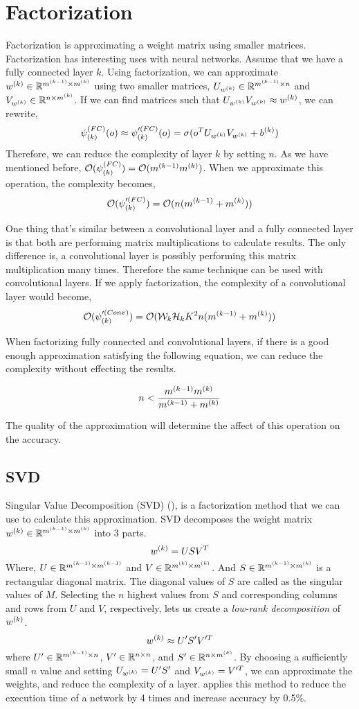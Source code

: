 \section{Factorization}
Factorization is approximating a weight matrix using smaller matrices. Factorization has interesting uses with neural networks. Assume that we have a fully connected layer $k$. Using factorization, we can approximate $w^{(k)} \in \mathbb{R}^{m^{(k-1)} \times m^{(k)}}$ using two smaller matrices, $U_{w^{(k)}} \in \mathbb{R}^{m^{(k-1)} \times n}$ and $V_{w^{(k)}} \in \mathbb{R}^{n \times m^{(k)}}$. If we can find matrices such that $U_{w^{(k)}}V_{w^{(k)}} \approx w^{(k)}$, we can rewrite, 
$$\psi^{(FC)}_{(k)}(o) \approx \psi'^{(FC)}_{(k)}(o) = \sigma(o^T U_{w^{(k)}}V_{w^{(k)}} +b^{(k)})$$
Therefore, we can reduce the complexity of layer $k$ by setting $n$. As we have mentioned before, $\mathcal{O}(\psi^{(FC)}_{(k)}) = \mathcal{O}(m^{(k-1)}m^{(k)})$. When we approximate this operation, the complexity becomes, 
$$\mathcal{O}(\psi'^{(FC)}_{(k)}) = \mathcal{O}(n(m^{(k-1)}+m^{(k)}))$$

One thing that's similar between a convolutional layer and a fully connected layer is that both are performing matrix multiplications to calculate results. The only difference is, a convolutional layer is possibly performing this matrix multiplication many times. Therefore the same technique can be used with convolutional layers. If we apply factorization, the complexity of a convolutional layer would become,
$$ \mathcal{O}(\psi'^{(Conv)}_{(k)}) =  \mathcal{O}(\mathcal{W}_{k}\mathcal{H}_{k}K^2n(m^{(k-1)}+m^{(k)})) $$

When factorizing fully connected and convolutional layers, if there is a good enough approximation satisfying the following equation, we can reduce the complexity without effecting the results.

$$n < \frac{m^{(k-1)}m^{(k)}}{m^{(k-1)}+m^{(k)}}$$ 

The quality of the approximation will determine the affect of this operation on the accuracy.

\subsection{SVD}
Singular Value Decomposition (SVD) (\cite{golub1970singular}), is a factorization method that we can use to calculate this approximation. SVD decomposes the weight matrix $w^{(k)} \in \mathbb{R}^{m^{(k-1)} \times m^{(k)}}$ into $3$ parts. 
$$ w^{(k)} = USV^T $$
Where, $U \in \mathbb{R}^{m^{(k-1)} \times m^{(k-1)}}$ and $V \in \mathbb{R}^{m^{(k)} \times m^{(k)}}$. And $S \in \mathbb{R}^{m^{(k-1)} \times m^{(k)}}$ is a rectangular diagonal matrix. The diagonal values of $S$ are called as the singular values of $M$. Selecting the $n$ highest values from $S$ and corresponding columns and rows from $U$ and $V$, respectively, lets us create a \textit{low-rank decomposition} of $w^{(k)}$. 
$$ w^{(k)} \approx U'S'V'^T $$
where $U' \in \mathbb{R}^{m^{(k-1)} \times n}$, $V' \in \mathbb{R}^{n \times n}$, and $S' \in \mathbb{R}^{n \times m^{(k)}}$. By choosing a sufficiently small $n$ value and setting $U_{w^{(k)}}=U'S'$ and $V_{w^{(k)}} = V'^T$, we can approximate the weights, and reduce the complexity of a layer. \cite{zhang2016accelerating} applies this method to reduce the execution time of a network by 4 times and increase accuracy by 0.5\%.

